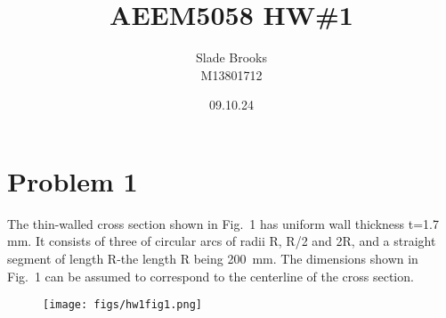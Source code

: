 \documentclass[12 pt]{article}
\title{AEEM5058 HW\#1}
\date{09.10.24}
\author{Slade Brooks \\ M13801712}
\begin{document}
\maketitle

\section*{Problem 1}
The thin-walled cross section shown in Fig.~1 has uniform wall thickness t=1.7 mm. It consists of three of circular arcs
of radii R, R/2 and 2R, and a straight segment of length R-the length R being 200~mm. The dimensions shown in Fig.~1 can
be assumed to correspond to the centerline of the cross section.
\begin{figure}[!hbtp]
    \centering
    \texttt{[image: figs/hw1fig1.png]}
\end{figure} \par
\end{document}
